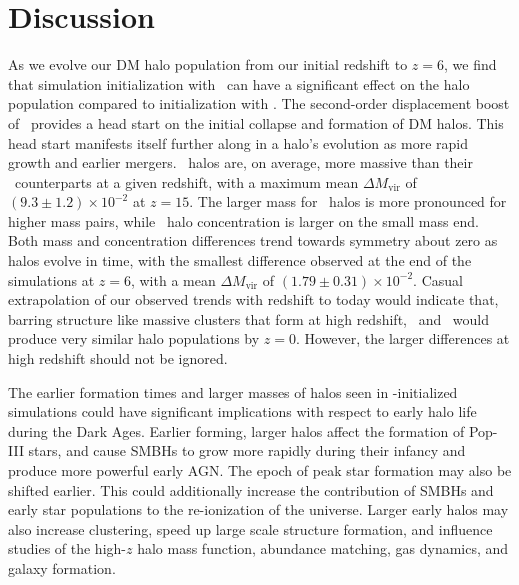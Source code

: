 
%
%

\section{Discussion}
\label{sec:2lpt--discussion}







As we evolve our DM halo population from our initial redshift to $z = 6$, we find that simulation initialization with \lpt\ can have a significant effect on the halo population compared to initialization with \za.  The second-order displacement boost of \lpt\ provides a head start on the initial collapse and formation of DM halos.  This head start manifests itself further along in a halo's evolution as more rapid growth and earlier mergers.  \lpt\ halos are, on average, more massive than their \za\ counterparts at a given redshift, with a maximum mean $\Delta M_{\mathrm{vir}}$ of $(9.3 \pm 1.2) \times 10^{-2}$ at $z = 15$.  The larger mass for \lpt\ halos is more pronounced for higher mass pairs, while \lpt\ halo concentration is larger on the small mass end.  Both mass and concentration differences trend towards symmetry about zero as halos evolve in time, with the smallest difference observed at the end of the simulations at $z = 6$, with a mean $\Delta M_{\mathrm{vir}}$ of $(1.79 \pm 0.31) \times 10^{-2}$.  Casual extrapolation of our observed trends with redshift to today would indicate that, barring structure like massive clusters that form at high redshift, \lpt\ and \za\ would produce very similar halo populations by $z = 0$.  However, the larger differences at high redshift should not be ignored.






The earlier formation times and larger masses of halos seen in \lpt-initialized simulations could have significant implications with respect to early halo life during the Dark Ages.  Earlier forming, larger halos affect the formation of Pop-III stars, and cause SMBHs to grow more rapidly during their infancy \citep{2012ApJ...761L...8H} and produce more powerful early AGN.  The epoch of peak star formation may also be shifted earlier.  This could additionally increase the contribution of SMBHs and early star populations to the re-ionization of the universe.  Larger early halos may also increase clustering, speed up large scale structure formation, and influence studies of the high-$z$ halo mass function, abundance matching, gas dynamics, and galaxy formation.


